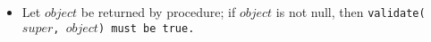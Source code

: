 \begin{itemize}

\item Let $object$ be returned by procedure; if $object$ is not null,
then \tt{validate(}$super$\tt{,} $object$\tt{)} must be \tt{true}.

\end{itemize}
